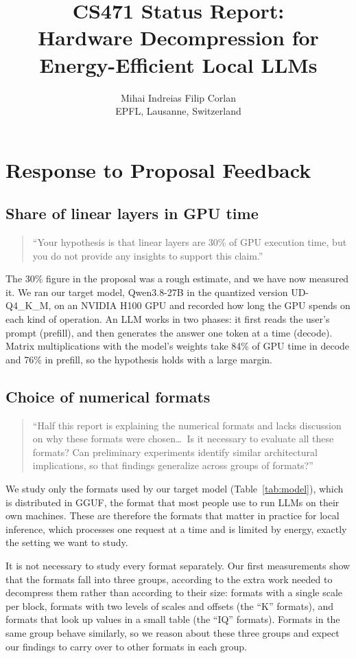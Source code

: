 \documentclass[10pt,twocolumn,letterpaper]{article}
\title{\vspace{-1.6em}\Large\bfseries CS471 Status Report:\\ Hardware Decompression for Energy-Efficient Local LLMs\vspace{-0.6em}}
\author{Mihai Indreias \qquad Filip Corlan\\ \small EPFL, Lausanne, Switzerland}
\date{\vspace{-1.2em}}
\begin{document}
\maketitle

\section{Response to Proposal Feedback}

\subsection{Share of linear layers in GPU time}
\begin{quote}\small
``Your hypothesis is that linear layers are 30\% of GPU execution time, but you do not provide any insights to
support this claim.''
\end{quote}
The 30\% figure in the proposal was a rough estimate, and we have now measured it. We ran our target model,
Qwen3.8-27B in the quantized version UD-Q4\_K\_M, on an NVIDIA H100 GPU and recorded how long the GPU spends on each
kind of operation. An LLM works in two phases: it first reads the user's prompt (prefill), and then generates the
answer one token at a time (decode). Matrix multiplications with the model's weights take 84\% of GPU time in decode
and 76\% in prefill, so the hypothesis holds with a large margin.

\subsection{Choice of numerical formats}
\begin{quote}\small
``Half this report is explaining the numerical formats and lacks discussion on why these formats were
chosen\ldots\ Is it necessary to evaluate all these formats? Can preliminary experiments identify similar
architectural implications, so that findings generalize across groups of formats?''
\end{quote}
We study only the formats used by our target model
(Table~\ref{tab:model}), which is distributed in GGUF, the format that most people use to run LLMs on their own
machines. These are therefore the formats that matter in practice for local inference, which processes one request
at a time and is limited by energy, exactly the setting we want to study.

It is not necessary to study every format separately. Our first measurements show that the formats fall into three
groups, according to the extra work needed to decompress them rather than according to their size: formats with a
single scale per block, formats with two levels of scales and offsets (the ``K'' formats), and formats that look up
values in a small table (the ``IQ'' formats). Formats in the same group behave similarly, so we reason about these
three groups and expect our findings to carry over to other formats in each group.
\end{document}
